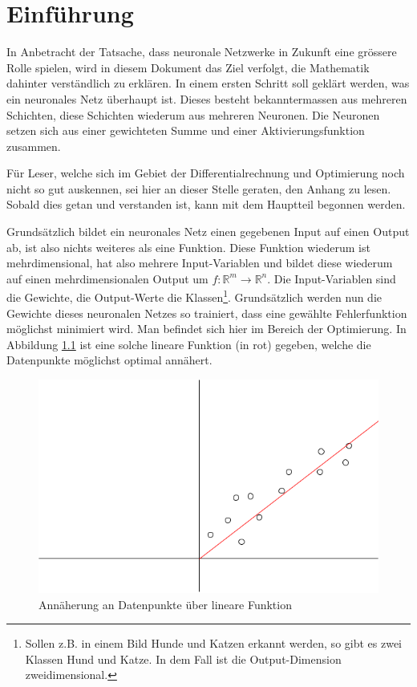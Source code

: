 \chapter{Einführung}
In Anbetracht der Tatsache, dass neuronale Netzwerke in Zukunft eine grössere Rolle spielen, wird in diesem Dokument
das Ziel verfolgt, die Mathematik dahinter verständlich zu erklären. In einem ersten Schritt soll geklärt werden,
was ein neuronales Netz überhaupt ist. Dieses besteht bekanntermassen aus mehreren Schichten, diese Schichten wiederum
aus mehreren Neuronen. Die Neuronen setzen sich aus einer gewichteten Summe und einer Aktivierungsfunktion zusammen.

Für Leser, welche sich im Gebiet der Differentialrechnung und Optimierung noch nicht so gut auskennen, sei hier
an dieser Stelle geraten, den Anhang zu lesen. Sobald dies getan und verstanden ist, kann mit dem Hauptteil
begonnen werden.

Grundsätzlich bildet ein neuronales Netz einen gegebenen Input auf einen Output ab, ist also nichts weiteres als
eine Funktion. Diese Funktion wiederum ist mehrdimensional, hat also mehrere Input-Variablen und bildet diese wiederum
auf einen mehrdimensionalen Output um $f: \mathbb{R}^m \rightarrow \mathbb{R}^n$. Die Input-Variablen sind die Gewichte, die Output-Werte
die Klassen\footnote{Sollen z.B. in einem Bild Hunde und Katzen erkannt werden, so gibt es zwei Klassen \glqq Hund\grqq{} und \glqq Katze\grqq.
In dem Fall ist die Output-Dimension zweidimensional.}. Grundsätzlich werden nun die Gewichte dieses neuronalen Netzes so trainiert, dass eine gewählte Fehlerfunktion
möglichst minimiert wird. Man befindet sich hier im Bereich der Optimierung. In Abbildung \ref{fig:05_approximation}
ist eine solche lineare Funktion (in rot) gegeben, welche die Datenpunkte möglichst optimal annähert.
\begin{figure}[h!]
    \begin{center}
        \includegraphics[width=0.4\linewidth]{../common/00_introduction/00_resources/00_approximation.png}
    \end{center}
    \caption{Annäherung an Datenpunkte über lineare Funktion}
    \label{fig:05_approximation}
\end{figure}